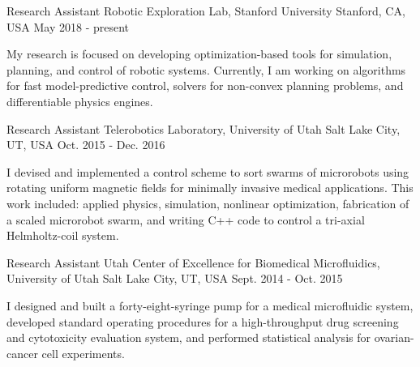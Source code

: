 

\begin{cventries}

  \cventry
    {Research Assistant} %
    {Robotic Exploration Lab, Stanford University} %
    {Stanford, CA, USA} %
    {May 2018 - present} %
    {
      \begin{cvitems} %
      My research is focused on developing optimization-based tools for simulation, planning, and control of robotic systems. Currently, I am working on algorithms for fast model-predictive control, solvers for non-convex planning problems, and differentiable physics engines. 
      \end{cvitems}
    }
    
  \cventry
    {Research Assistant} %
    {Telerobotics Laboratory, University of Utah} %
    {Salt Lake City, UT, USA} %
    {Oct. 2015 - Dec. 2016} %
    {
      \begin{cvitems} %
      I devised and implemented a control scheme to sort swarms of microrobots using rotating uniform magnetic fields for minimally invasive medical applications. This work included: applied physics, simulation, nonlinear optimization, fabrication of a scaled microrobot swarm, and writing C++ code to control a tri-axial Helmholtz-coil system.
      \end{cvitems}
    }
    
  \cventry
    {Research Assistant} %
    {Utah Center of Excellence for Biomedical Microfluidics, University of Utah} %
    {Salt Lake City, UT, USA} %
    {Sept. 2014 - Oct. 2015} %
    {
      \begin{cvitems} %
      I designed and built a forty-eight-syringe pump for a medical microfluidic system, developed standard operating procedures for a high-throughput drug screening and cytotoxicity evaluation system, and performed statistical analysis for ovarian-cancer cell experiments.
      \end{cvitems}
    }

\end{cventries}
